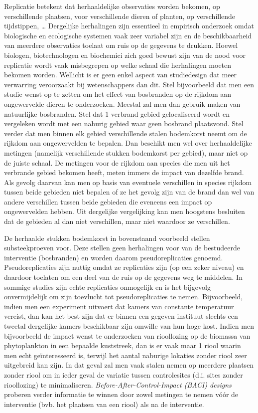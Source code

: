 \documentclass[
  12pt,dutch,coursenotes]{book}
\theoremstyle{definition}
\theoremstyle{definition}
\theoremstyle{definition}
\theoremstyle{definition}
\theoremstyle{remark}
\begin{document}
Replicatie betekent dat herhaaldelijke observaties worden bekomen, op verschillende plaatsen, voor verschillende dieren of planten, op verschillende tijdstippen, \ldots{} Dergelijke herhalingen zijn essentieel in empirisch onderzoek omdat biologische en ecologische systemen vaak zeer variabel zijn en de beschikbaarheid van meerdere observaties toelaat om ruis op de gegevens te drukken. Hoewel biologen, biotechnologen en biochemici zich goed bewust zijn van de nood voor replicatie wordt vaak misbegrepen op welke schaal die herhalingen moeten bekomen worden. Wellicht is er geen enkel aspect van studiedesign dat meer verwarring veroorzaakt bij wetenschappers dan dit. Stel bijvoorbeeld dat men een studie wenst op te zetten om het effect van bosbranden op de rijkdom aan ongewervelde dieren te onderzoeken. Meestal zal men dan gebruik maken van natuurlijke bosbranden. Stel dat 1 verbrand gebied gelocaliseerd wordt en vergeleken wordt met een naburig gebied waar geen bosbrand plaatsvond. Stel verder dat men binnen elk gebied verschillende stalen bodemkorst neemt om de rijkdom aan ongewervelden te bepalen. Dan beschikt men wel over herhaaldelijke metingen (namelijk verschillende stukken bodemkorst per gebied), maar niet op de juiste schaal. De metingen voor de rijkdom aan species die men uit het verbrande gebied bekomen heeft, meten immers de impact van dezelfde brand. Als gevolg daarvan kan men op basis van eventuele verschillen in species rijkdom tussen beide gebieden niet bepalen of ze het gevolg zijn van de brand dan wel van andere verschillen tussen beide gebieden die eveneens een impact op ongewervelden hebben. Uit dergelijke vergelijking kan men hoogstens besluiten dat de gebieden al dan niet verschillen, maar niet waardoor ze verschillen.

De herhaalde stukken bodemkorst in bovenstaand voorbeeld stellen substeekproeven voor. Deze stellen geen herhalingen voor van de bestudeerde interventie (bosbranden) en worden daarom pseudoreplicaties genoemd. Pseudoreplicaties zijn nuttig omdat ze replicaties zijn (op een zeker niveau) en daardoor toelaten om een deel van de ruis op de gegevens weg te middelen. In sommige studies zijn echte replicaties onmogelijk en is het bijgevolg onvermijdelijk om zijn toevlucht tot pseudoreplicaties te nemen. Bijvoorbeeld, indien men een experiment uitvoert dat kamers van constante temperatuur vereist, dan kan het best zijn dat er binnen een gegeven instituut slechts een tweetal dergelijke kamers beschikbaar zijn omwille van hun hoge kost. Indien men bijvoorbeeld de impact wenst te onderzoeken van rioollozing op de biomassa van phytoplankton in een bepaalde kuststreek, dan is er vaak maar 1 riool waarin men echt geïnteresseerd is, terwijl het aantal naburige lokaties zonder riool zeer uitgebreid kan zijn. In dat geval zal men vaak stalen nemen op meerdere plaatsen zonder riool om in ieder geval de variatie tussen controlesites (d.i. sites zonder rioollozing) te minimaliseren. \emph{Before-After-Control-Impact (BACI) designs} proberen verder informatie te winnen door zowel metingen te nemen vóór de interventie (bvb. het plaatsen van een riool) als na de interventie.
\end{document}
